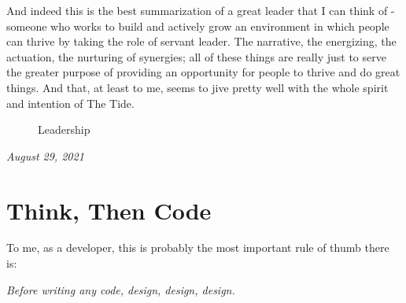 \documentclass[10pt,a5paper]{book}
\begin{document}
And indeed this is the best summarization of a great leader that I can think of - someone who works to build and actively grow an environment in which people can thrive by taking the role of servant leader. The narrative, the energizing, the actuation, the nurturing of synergies; all of these things are really just to serve the greater purpose of providing an opportunity for people to thrive and do great things. And that, at least to me, seems to jive pretty well with the whole spirit and intention of The Tide. 


\begin{figure}[!htb]
\caption{\label{fig:my-label} Leadership}
\end{figure}

\textit{August 29, 2021}

\newpage

\section{Think, Then Code}
To me, as a developer, this is probably the most important rule of thumb there is:\linebreak

\textit{Before writing any code, design, design, design.}\linebreak
\end{document}
